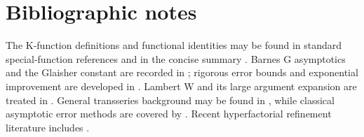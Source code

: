 \documentclass[11pt,a4paper]{article}
\numberwithin{equation}{section}
\theoremstyle{remark}
\begin{document}
\section{Bibliographic notes}

The K-function definitions and functional identities may be found in
standard special-function references and in the concise summary
\cite{KFunctionWiki}.  Barnes G asymptotics and the Glaisher constant are
recorded in \cite{DLMFBarnesG}; rigorous error bounds and exponential
improvement are developed in \cite{Nemes2014}.  Lambert W and its large
argument expansion are treated in \cite{Corless1996,DLMFW}.  General
transseries background may be found in \cite{vanDerHoeven2006}, while
classical asymptotic error methods are covered by \cite{Olver1997}.  Recent
hyperfactorial refinement literature includes \cite{Xu2020}.
\end{document}
